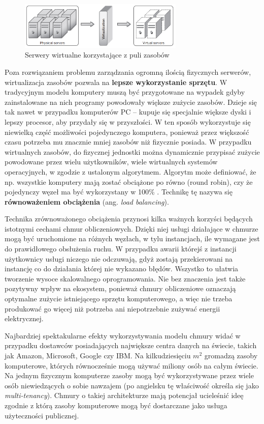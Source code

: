 \documentclass[12pt,a4paper,twoside,titlepage,openright]{book}
\begin{document}
\begin{figure}[h]
	\centering
			\includegraphics[width=0.7\textwidth]{pooling.png}
		\caption{Serwery wirtualne korzystające z puli zasobów \cite{ccCambridge}}
		\label{fig:pooling}
\end{figure}

Poza rozwiązaniem problemu zarządzania ogromną ilością fizycznych serwerów, wirtualizacja zasobów pozwala na \textbf{lepsze wykorzystanie sprzętu}. W tradycyjnym modelu komputery muszą być przygotowane na wypadek gdyby zainstalowane na nich programy powodowały większe zużycie zasobów. Dzieje się tak nawet w przypadku komputerów PC -- kupuje się specjalnie większe dyski i lepszy procesor, aby przydały się w przyszłości. W ten sposób wykorzystuje się niewielką część możliwości pojedynczego komputera, ponieważ przez większość czasu potrzeba mu znacznie mniej zasobów niż fizycznie posiada. W przypadku wirtualnych zasobów, do fizycznej jednostki można dynamicznie przypisać zużycie powodowane przez wielu użytkowników, wiele wirtualnych systemów operacyjnych, w zgodzie z ustalonym algorytmem. Algorytm może definiować, że np. wszystkie komputery mają zostać obciążone po równo (round robin), czy że pojedynczy węzeł ma być wykorzystany w 100\% \cite{cloudFoundry}. Technikę tę nazywa się \textbf{równoważeniem obciążenia} (ang. \textit{load balancing}).

Technika zrównoważonego obciążenia przynosi kilka ważnych korzyści będących istotnymi cechami chmur obliczeniowych. Dzięki niej usługi działające w chmurze mogą być uruchomione na różnych węzłach, w tylu instancjach, ile wymagane jest do prawidłowego obsłużenia ruchu. W przypadku awarii którejś z instancji użytkownicy usługi niczego nie odczuwają, gdyż zostają przekierowani na instancję co do działania której nie wykazano błędów. Wszystko to ułatwia tworzenie wysoce skalowalnego oprogramowania. Nie bez znaczenia jest także pozytywny wpływ na ekosystem, ponieważ chmury obliczeniowe oznaczają optymalne zużycie istniejącego sprzętu komputerowego, a więc nie trzeba produkować go więcej niż potrzeba ani niepotrzebnie zużywać energii elektrycznej.

Najbardziej spektakularne efekty wykorzystywania modelu chmury widać w przypadku dostawców posiadających największe centra danych na świecie, takich jak Amazon, Microsoft, Google czy IBM. Na kilkudziesięciu $m^{2}$ gromadzą zasoby komputerowe, których równocześnie mogą używać miliony osób na całym świecie. Na jednym fizycznym komputerze zasoby mogą być wykorzystywane przez wiele osób niewiedzących o sobie nawzajem (po angielsku tę właściwość określa się jako \textit{multi-tenancy}). Chmury o takiej architekturze mają potencjał ucieleśnić ideę zgodnie z którą zasoby komputerowe mogą być dostarczane jako usługa użyteczności publicznej.
\end{document}
